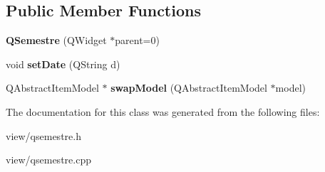 \subsection*{Public Member Functions}
\begin{DoxyCompactItemize}
\item 
\hypertarget{classQSemestre_a1de8cbdf9565a02c82d42249b3d85385}{{\bfseries Q\+Semestre} (Q\+Widget $\ast$parent=0)}\label{classQSemestre_a1de8cbdf9565a02c82d42249b3d85385}

\item 
\hypertarget{classQSemestre_a8cf64a11af7dffe04cb5f94ad0f1106e}{void {\bfseries set\+Date} (Q\+String d)}\label{classQSemestre_a8cf64a11af7dffe04cb5f94ad0f1106e}

\item 
\hypertarget{classQSemestre_ac2b21d3e479163792c19c80b26593024}{Q\+Abstract\+Item\+Model $\ast$ {\bfseries swap\+Model} (Q\+Abstract\+Item\+Model $\ast$model)}\label{classQSemestre_ac2b21d3e479163792c19c80b26593024}

\end{DoxyCompactItemize}


The documentation for this class was generated from the following files\+:\begin{DoxyCompactItemize}
\item 
view/qsemestre.\+h\item 
view/qsemestre.\+cpp\end{DoxyCompactItemize}
